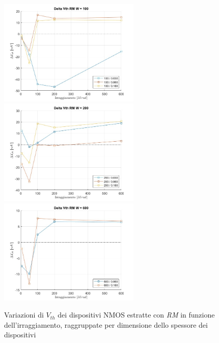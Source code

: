 \documentclass[12pt, letterpaper]{book}
\begin{document}
\begin{figure}[H]
  \centering
  \includegraphics[width=0.6\textwidth]{sovrapposizione-deltaVth-RM-N100}
  \includegraphics[width=0.6\textwidth]{sovrapposizione-deltaVth-RM-N200}
  \includegraphics[width=0.6\textwidth]{sovrapposizione-deltaVth-RM-N600}
  \caption{Variazioni di $V_{th}$ dei dispositivi NMOS estratte con \emph{RM} in funzione dell'irraggiamento, raggruppate per dimensione dello spessore dei dispositivi}
\end{figure}
\end{document}
